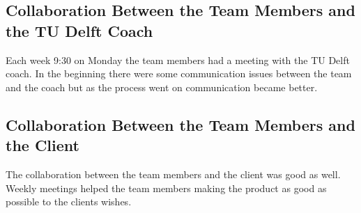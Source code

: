 \subsection{Collaboration Between the Team Members and the TU Delft Coach}
Each week 9:30 on Monday the team members had a meeting with the TU Delft coach. In the beginning there were some communication issues between the team and the coach but as the process went on communication became better.

\subsection{Collaboration Between the Team Members and the Client}
The collaboration between the team members and the client was good as well. 
Weekly meetings helped the team members making the product as good as possible to the clients wishes. 